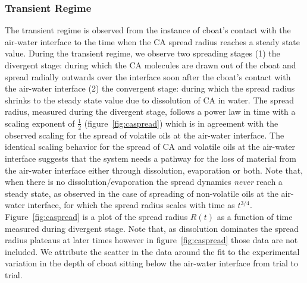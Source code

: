 \documentclass[journal=langd5, manuscript=article, layout=twocolumn]{achemso}
\begin{document}
\subsubsection{Transient Regime}
\label{sec:transient}
The transient regime is observed from the instance of cboat's contact with the air-water interface to the time when the CA spread radius reaches a steady state value. During the transient regime, we observe two spreading stages (1) the divergent stage: during which the CA molecules are drawn out of the cboat and spread radially outwards over the interface soon after the cboat's contact with the air-water interface (2) the convergent stage: during which the spread radius shrinks to the steady state value due to dissolution of CA in water. The spread radius, measured during the divergent stage, follows a power law in time with a scaling exponent of $\frac{1}{2}$ (figure~\ref{fig:caspread}) which is in agreement with the observed scaling for the spread of volatile oils\cite{troian1998} at the air-water interface. The identical scaling behavior for the spread of CA and volatile oils at the air-water interface suggests that the system needs a pathway for the loss of material from the air-water interface either through dissolution, evaporation or both. Note that, when there is no dissolution/evaporation the spread dynamics \emph{never} reach a steady state, as observed in the case of spreading of non-volatile oils at the air-water interface\cite{jensen1995, mahadevan2011}, for which the spread radius scales with time as $t^{3/4}$. Figure~\ref{fig:caspread} is a plot of the spread radius $R(t)$ as a function of time measured during divergent stage. Note that, as dissolution dominates the spread radius plateaus at later times however in figure~\ref{fig:caspread} those data are not included. We attribute the scatter in the data around the fit to the experimental variation in the depth of cboat sitting below the air-water interface from trial to trial.   
\end{document}
